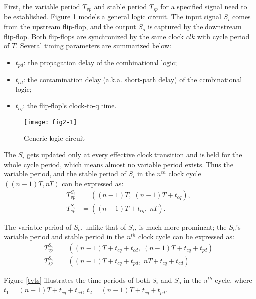 First, the variable period $T_{vp}$ and stable period $T_{sp}$ for a specified signal need to be established. Figure \ref{comb} models a general logic circuit. The input signal $S_i$ comes from the upstream flip-flop, and the output $S_o$ is captured by the downstream flip-flop. Both flip-flops are synchronized by the same clock $clk$ with cycle period of $T$. Several timing parameters are summarized below:
\begin{itemize}
    \item $t_{pd}$:  the  propagation delay of the combinational logic;

    \item $t_{cd}$:  the  contamination delay (a.k.a. short-path delay) of the combinational logic;

    \item $t_{cq}$: the flip-flop's  clock-to-q time.
\end{itemize}

\begin{figure}[t]
\centering
\texttt{[image: fig2-1]}
  \vspace{-0.5em} 
  \caption{Generic logic circuit}
  \label{comb}
\end{figure}

The $S_i$ gets updated only at every effective clock transition and is held for the whole cycle period, which means almost no variable period exists. Thus the variable period, and the stable period of $S_i$ in the $n^{th}$ clock cycle $((n-1)T, nT)$ can be expressed as:
\begin{align}
T_{vp}^{S_i}&=((n-1)T, \;(n-1)T+t_{cq}), \\
T_{sp}^{S_i}&=((n-1)T +t_{cq}, \;nT).
\end{align}

The variable period of $S_o$, unlike that of $S_i$, is much more prominent; the $S_o$'s  variable period and stable period in the $n^{th}$ clock cycle can be expressed as:
 \begin{align}
T_{vp}^{S_o}&=((n-1)T+t_{cq}+t_{cd},\; (n-1)T+t_{cq}+t_{pd}) \\
T_{sp}^{S_o}&=((n-1)T+t_{cq}+t_{pd},\; nT+t_{cq}+t_{cd}) \label{SoSP}
\end{align}

Figure \ref{tvts} illustrates the time periods of both $S_i$ and $S_o$ in the $n^{th}$ cycle, where $t_{1}=(n-1)T+t_{cq}+t_{cd}$, $t_{2}=(n-1)T+t_{cq}+t_{pd}$.

